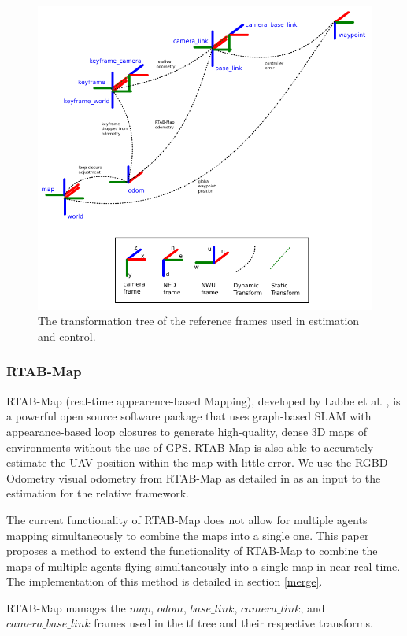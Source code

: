 \documentclass[letterpaper, 10 pt, conference]{ieeeconf}  %
\begin{document}
\begin{figure}
\centering
\includegraphics[width=0.9\linewidth]{tf_tree_relative_rtab}
\caption{The transformation tree of the reference frames used in estimation and control.}
\label{fig:tf_tree}
\end{figure}

\subsubsection{RTAB-Map}

RTAB-Map (real-time appearence-based Mapping), developed by Labbe et al. \cite{Labbe2011}\cite{Labbe2013}\cite{Labbe2019}, is a powerful open source software package that uses graph-based SLAM with appearance-based loop closures to generate high-quality, dense 3D maps of environments without the use of GPS.  RTAB-Map is also able to accurately estimate the UAV position within the map with little error. We use the RGBD-Odometry visual odometry from RTAB-Map as detailed in \cite{Labbe2019} as an input to the estimation for the relative framework.

The current functionality of RTAB-Map does not allow for multiple agents mapping simultaneously to combine the maps into a single one. This paper proposes a method to extend the functionality of RTAB-Map to combine the maps of multiple agents flying simultaneously into a single map in near real time. The implementation of this method is detailed in section \ref{merge}.

RTAB-Map manages the $\mathit{map}$, $\mathit{odom}$, $\mathit{base\_link}$, $\mathit{camera\_link}$, and $\mathit{camera\_base\_link}$ frames used in the tf tree and their respective transforms.
\end{document}
